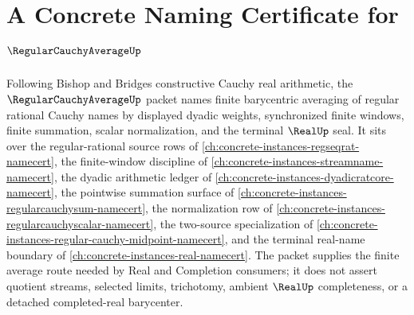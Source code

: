 \chapter{A Concrete Naming Certificate for $\RegularCauchyAverageUp$}
\label{ch:concrete-instances-regular-cauchy-average-namecert}

Following Bishop and Bridges constructive Cauchy real arithmetic, the $\RegularCauchyAverageUp$ packet names finite barycentric averaging of regular rational Cauchy names by displayed dyadic weights, synchronized finite windows, finite summation, scalar normalization, and the terminal $\RealUp$ seal. It sits over the regular-rational source rows of \autoref{ch:concrete-instances-regseqrat-namecert}, the finite-window discipline of \autoref{ch:concrete-instances-streamname-namecert}, the dyadic arithmetic ledger of \autoref{ch:concrete-instances-dyadicratcore-namecert}, the pointwise summation surface of \autoref{ch:concrete-instances-regularcauchysum-namecert}, the normalization row of \autoref{ch:concrete-instances-regularcauchyscalar-namecert}, the two-source specialization of \autoref{ch:concrete-instances-regular-cauchy-midpoint-namecert}, and the terminal real-name boundary of \autoref{ch:concrete-instances-real-namecert}. The packet supplies the finite average route needed by Real and Completion consumers; it does not assert quotient streams, selected limits, trichotomy, ambient $\RealUp$ completeness, or a detached completed-real barycenter.

